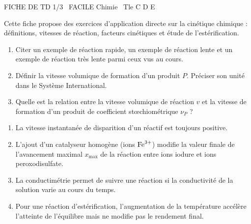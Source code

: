 \documentclass[11pt]{article}
\begin{document}
\begin{tcolorbox}[enhanced,colback=popink,colframe=popink,arc=10pt,boxrule=0pt,left=12pt,right=12pt,top=9pt,bottom=9pt]
{\color{white}\popxbold\small FICHE DE TD 1/3 \textbullet\ FACILE \hfill Chimie \textbullet\ Tle C D E\par}
\end{tcolorbox}
\vspace{4pt}
\noindent Cette fiche propose des exercices d'application directe sur la cinétique chimique : définitions, vitesses de réaction, facteurs cinétiques et étude de l'estérification.

\begin{exercice}
\begin{enumerate}
    \item Citer un exemple de réaction rapide, un exemple de réaction lente et un exemple de réaction très lente parmi ceux vus au cours.
    \item Définir la vitesse volumique de formation d'un produit $P$. Préciser son unité dans le Système International.
    \item Quelle est la relation entre la vitesse volumique de réaction $v$ et la vitesse de formation d'un produit de coefficient stœchiométrique $\nu_P$ ?
\end{enumerate}
\end{exercice}

\begin{exercice}
\begin{enumerate}
    \item La vitesse instantanée de disparition d'un réactif est toujours positive.
    \item L'ajout d'un catalyseur homogène (ions $\ce{Fe^{3+}}$) modifie la valeur finale de l'avancement maximal $x_{\text{max}}$ de la réaction entre ions iodure et ions peroxodisulfate.
    \item La conductimétrie permet de suivre une réaction si la conductivité de la solution varie au cours du temps.
    \item Pour une réaction d'estérification, l'augmentation de la température accélère l'atteinte de l'équilibre mais ne modifie pas le rendement final.
\end{enumerate}
\end{exercice}
\end{document}
